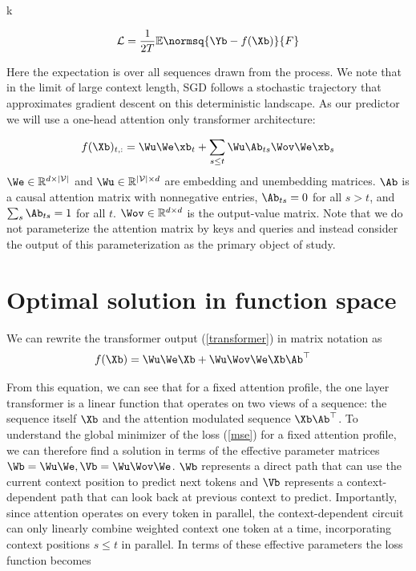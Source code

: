 k\documentclass{article}
\begin{document}
\begin{equation}\label{mse}
    \mathcal{L} = \frac{1}{2T} \mathbb{E}\normsq{\Yb - f(\Xb)}{F}
\end{equation}

Here the expectation is over all sequences drawn from the process. We note that in the limit of large context length, SGD follows a stochastic trajectory that approximates gradient descent on this deterministic landscape. As our predictor we will use a one-head attention only transformer architecture: 

\begin{equation}\label{transformer}
    f(\Xb)_{t,:} = \Wu\We \xb_t + \sum_{s \le t} \Wu \Ab_{ts}\Wov\We \xb_s
\end{equation}
$\We \in \mathbb{R}^{d \times |\mathcal{V}|}$ and $\Wu \in \mathbb{R}^{|\mathcal{V}|\times d}$ are embedding and unembedding matrices. $\Ab$ is a causal attention matrix with nonnegative entries,  $\Ab_{ts} = 0$ for all $s > t$, and $\sum_{s} \Ab_{ts} = 1$ for all $t$. $\Wov \in \mathbb{R}^{d \times d}$ is the output-value matrix. Note that we do not parameterize the attention matrix by keys and queries and instead consider the output of this parameterization as the primary object of study. 

\section{Optimal solution in function space}
We can rewrite the transformer output (\ref{transformer}) in matrix notation as
\begin{align}\label{transformer_matrix}
     f(\Xb) &= \Wu\We \Xb + \Wu \Wov\We \Xb \Ab^\top
\end{align}

From this equation, we can see that for a fixed attention profile, the one layer transformer is a linear function that operates on two views of a sequence: the sequence itself $\Xb$ and the attention modulated sequence $\Xb\Ab^\top$. To understand the global minimizer of the loss (\ref{mse}) for a fixed attention profile, we can therefore find a solution in terms of the effective parameter matrices $\Wb = \Wu\We, \Vb = \Wu \Wov\We$. $\Wb$ represents a direct path that can use the current context position to predict next tokens and $\Vb$ represents a context-dependent path that can look back at previous context to predict. Importantly, since attention operates on every token in parallel, the context-dependent circuit can only linearly combine weighted context one token at a time, incorporating context positions $s \le t$ in parallel. In terms of these effective parameters the loss function becomes
\end{document}
